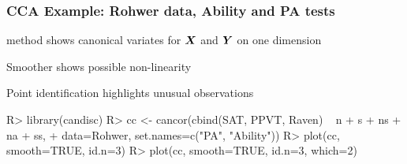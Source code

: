 \begin{frame}[fragile]
\frametitle{CCA Example: Rohwer data, Ability and PA tests}
\begin{itemize*}
	\item {} method shows canonical variates for $\bm{X}$ and $\bm{Y}$ on one dimension
	\item Smoother shows possible non-linearity
	\item Point identification highlights unusual observations
\end{itemize*}
\begin{CodeInput}[baselinestretch=0.75]
R> library(candisc)
R> cc <- cancor(cbind(SAT, PPVT, Raven) ~ n + s + ns + na + ss, 
+          data=Rohwer, set.names=c("PA", "Ability"))
R> plot(cc, smooth=TRUE, id.n=3)
R> plot(cc, smooth=TRUE, id.n=3, which=2)
\end{CodeInput}


\end{frame}
